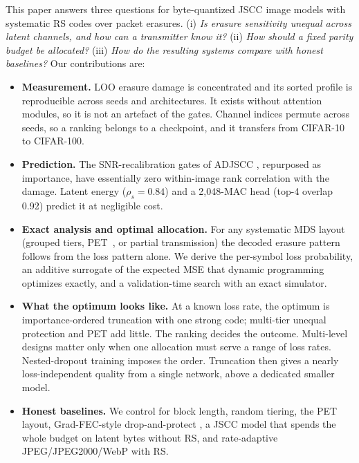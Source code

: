 \documentclass[conference]{IEEEtran}
\begin{document}
This paper answers three questions for byte-quantized JSCC image models with systematic RS codes over
packet erasures. (i) \emph{Is erasure sensitivity unequal across latent channels, and how can a
transmitter know it?} (ii) \emph{How should a fixed parity budget be allocated?} (iii) \emph{How do the
resulting systems compare with honest baselines?} Our contributions are:
\begin{itemize}
\item \textbf{Measurement.} LOO erasure damage is concentrated and its sorted profile is reproducible
across seeds and architectures. It exists without attention modules, so it is not an artefact of the
gates. Channel indices permute across seeds, so a ranking belongs to a checkpoint, and it transfers from
CIFAR-10 to CIFAR-100.
\item \textbf{Prediction.} The SNR-recalibration gates of ADJSCC \cite{xu2022adjscc}, repurposed as
importance, have essentially zero within-image rank correlation with the damage. Latent energy
($\rho_s=0.84$) and a 2,048-MAC head (top-4 overlap 0.92) predict it at negligible cost.
\item \textbf{Exact analysis and optimal allocation.} For any systematic MDS layout (grouped tiers,
PET~\cite{albanese1996pet}, or partial transmission) the decoded erasure pattern follows from the loss
pattern alone. We derive the per-symbol loss probability, an additive surrogate of the expected MSE that
dynamic programming optimizes exactly, and a validation-time search with an exact simulator.
\item \textbf{What the optimum looks like.} At a known loss rate, the optimum is importance-ordered
truncation with one strong code; multi-tier unequal protection and PET add little. The ranking decides
the outcome. Multi-level designs matter only when one allocation must serve a range of loss rates.
Nested-dropout training imposes the order. Truncation then gives a nearly loss-independent quality from a
single network, above a dedicated smaller model.
\item \textbf{Honest baselines.} We control for block length, random tiering, the PET layout,
Grad-FEC-style drop-and-protect \cite{uyanik2023gradfec}, a JSCC model that spends the whole budget on
latent bytes without RS, and rate-adaptive JPEG/JPEG2000/WebP with RS.
\end{itemize}

\end{document}
